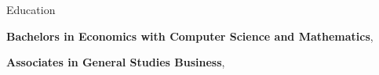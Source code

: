 \documentclass{resume} %
\begin{document}

\begin{rSection}{Education}
\vspace{-0.90em}
  \item \textbf{Bachelors in Economics with Computer Science and Mathematics}, 
  \item \textbf{Associates in General Studies Business}, 
\end{rSection}
\end{document}
